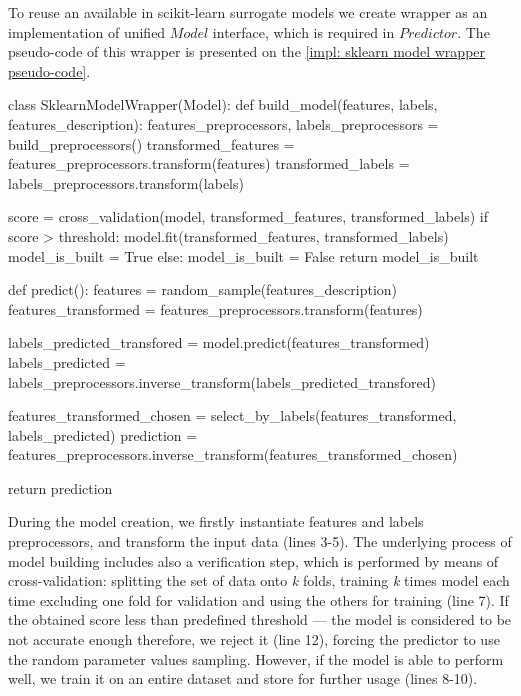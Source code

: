 To reuse an available in scikit-learn surrogate models we create wrapper as an implementation of unified $Model$ interface, which is required in $Predictor$. The pseudo-code of this wrapper is presented on the \cref{impl: sklearn model wrapper pseudo-code}.

\begin{code}[language=Python, caption=Scikit-learn linear model wrapper pseudo-code., label=impl: sklearn model wrapper pseudo-code]
class SklearnModelWrapper(Model):
	def build_model(features, labels, features_description):
		features_preprocessors, labels_preprocessors = build_preprocessors()
		transformed_features = features_preprocessors.transform(features)
	 	transformed_labels = labels_preprocessors.transform(labels)
	 	
	 	score = cross_validation(model, transformed_features, transformed_labels)
	 	if score > threshold:
	 		model.fit(transformed_features, transformed_labels)
	 		model_is_built = True
	 	else:
	 		model_is_built = False
	 	return model_is_built
	 
	 def predict():
	 	features = random_sample(features_description)
	 	features_transformed = features_preprocessors.transform(features)
	 	
	 	labels_predicted_transfored = model.predict(features_transformed)
	 	labels_predicted = labels_preprocessors.inverse_transform(labels_predicted_transfored)
	 	
	 	features_transformed_chosen = select_by_labels(features_transformed, labels_predicted)
	 	prediction = features_preprocessors.inverse_transform(features_transformed_chosen)
	 	
		return prediction
\end{code}

During the model creation, we firstly instantiate features and labels preprocessors, and transform the input data (lines 3-5). The underlying process of model building includes also a verification step, which is performed by means of cross-validation: splitting the set of data onto \textit{k} folds, training \textit{k} times model each time excluding one fold for validation and using the others for training (line 7). If the obtained score less than predefined threshold — the model is considered to be not accurate enough therefore, we reject it (line 12), forcing the predictor to use the random parameter values sampling. However, if the model is able to perform well, we train it on an entire dataset and store for further usage (lines 8-10).

